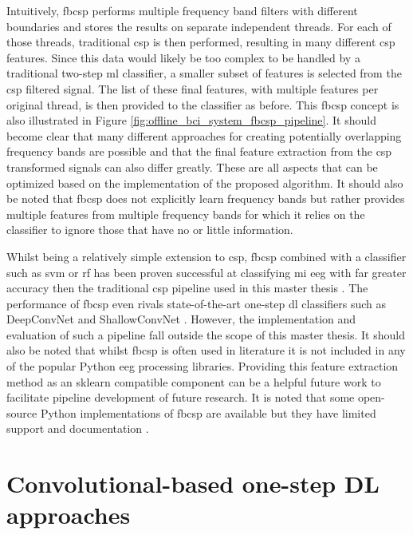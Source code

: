Intuitively, \gls{fbcsp} performs multiple frequency band filters with different boundaries and stores the results on separate independent threads.
For each of those threads, traditional \gls{csp} is then performed, resulting in many different \gls{csp} features.
Since this data would likely be too complex to be handled by a traditional two-step \gls{ml} classifier, a smaller subset of features is selected from the \gls{csp} filtered signal.
The list of these final features, with multiple features per original thread, is then provided to the classifier as before.
This \gls{fbcsp} concept is also illustrated in Figure \ref{fig:offline_bci_system_fbcsp_pipeline}.
It should become clear that many different approaches for creating potentially overlapping frequency bands are possible and that the final feature extraction from the \gls{csp} transformed signals can also differ greatly.
These are all aspects that can be optimized based on the implementation of the proposed algorithm.
It should also be noted that \gls{fbcsp} does not explicitly learn frequency bands but rather provides multiple features from multiple frequency bands for which it relies on the classifier to ignore those that have no or little information.

Whilst being a relatively simple extension to \gls{csp}, \gls{fbcsp} combined with a classifier such as \gls{svm} or \gls{rf} has been proven successful at classifying \gls{mi} \gls{eeg} with far greater accuracy then the traditional \gls{csp} pipeline used in this master thesis \citep{eeg_model_fbcsp, four_class_mi_CSP_good, fbcsp_classi_eeg_mi}.
The performance of \gls{fbcsp} even rivals state-of-the-art one-step \gls{dl} classifiers such as DeepConvNet and ShallowConvNet \citep{eeg_model_hbm}.
However, the implementation and evaluation of such a pipeline fall outside the scope of this master thesis.
It should also be noted that whilst \gls{fbcsp} is often used in literature it is not included in any of the popular Python \gls{eeg} processing libraries.
Providing this feature extraction method as an \gls{sklearn} compatible component can be a helpful future work to facilitate pipeline development of future research.
It is noted that some open-source Python implementations of \gls{fbcsp} are available but they have limited support and documentation \citep{fbcsp_git1, fbcsp_git2}.



\section{Convolutional-based one-step DL approaches}
\label{sec:offline_bci_system_one_step_dl}

